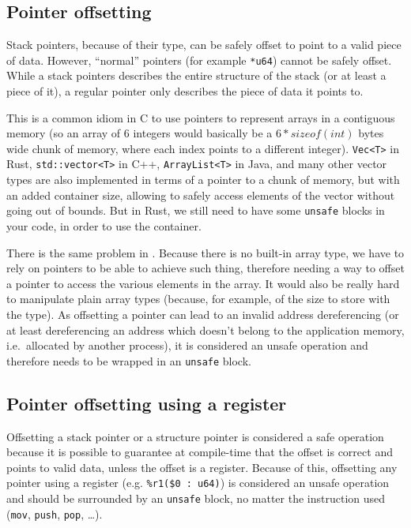 \subsection{Pointer offsetting}\label{subsec:nstar-common-unsafe-ptroffset}

Stack pointers, because of their type, can be safely offset to point to a valid piece of data.
However, ``normal'' pointers (for example \texttt{*u64}) cannot be safely offset.
While a stack pointers describes the entire structure of the stack (or at least a piece of it), a regular pointer only describes the piece of data it points to.

This is a common idiom in C to use pointers to represent arrays in a contiguous memory (so an array of 6 integers would basically be a $6 * sizeof(int)$ bytes wide chunk of memory, where each index points to a different integer).
\texttt{Vec<T>} in Rust, \texttt{std::vector<T>} in C++, \texttt{ArrayList<T>} in Java, and many other vector types are also implemented in terms of a pointer to a chunk of memory, but with an added container size, allowing to safely access elements of the vector without going out of bounds.
But in Rust, we still need to have some \texttt{unsafe} blocks in your code, in order to use the container.

There is the same problem in \nstar.
Because there is no built-in array type, we have to rely on pointers to be able to achieve such thing, therefore needing a way to offset a pointer to access the various elements in the array.
It would also be really hard to manipulate plain array types (because, for example, of the size to store with the type).
As offsetting a pointer can lead to an invalid address dereferencing (or at least dereferencing an address which doesn't belong to the application memory, i.e.\ allocated by another process), it is considered an unsafe operation and therefore needs to be wrapped in an \texttt{unsafe} block.

\subsection{Pointer offsetting using a register}\label{subsec:nstar-common-unsafe-ptroffsetreg}

Offsetting a stack pointer or a structure pointer is considered a safe operation because it is possible to guarantee at compile-time that the offset is correct and points to valid data, unless the offset is a register.
Because of this, offsetting any pointer using a register (e.g. \texttt{\%r1(\$0 : u64)}) is considered an unsafe operation and should be surrounded by an \texttt{unsafe} block, no matter the instruction used (\texttt{mov}, \texttt{push}, \texttt{pop}, \ldots).

